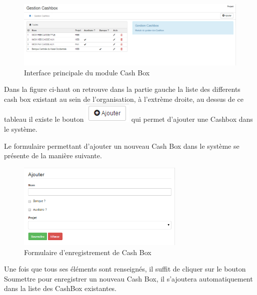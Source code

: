 \documentclass[12pt,a4paper]{report}
\begin{document}
\begin{figure}[h]
\begin{center}
\includegraphics[width=14cm]{pic/GestCashBox.png}
\end{center}
\caption{Interface principale du module Cash Box}
\label{Interface principale du module Cash Box}
\end{figure} 

Dans la figure ci-haut on retrouve dans la partie gauche la liste des differents cash box existant au sein de l'organisation, à l'extrème droite, au dessus de ce tableau il existe le bouton \includegraphics[scale=1]{pic/AddNewStore.png} qui permet d'ajouter une Cashbox dans le système.

Le formulaire permettant d'ajouter un nouveau Cash Box dans le système se présente de la manière suivante.

\begin{figure}[h]
\begin{center}
\includegraphics[width=8cm]{pic/FormAddCash.png} 
\end{center}
\caption{Formulaire d'enregistrement de Cash Box}
\label{Formulaire d'enregistrement de Cash Box}
\end{figure} 

Une fois que tous ses éléments sont renseignés, il suffit de cliquer sur le bouton Soumettre pour enregistrer un nouveau Cash Box, il s'ajoutera automatiquement dans la liste des CashBox existantes. 
\end{document}
